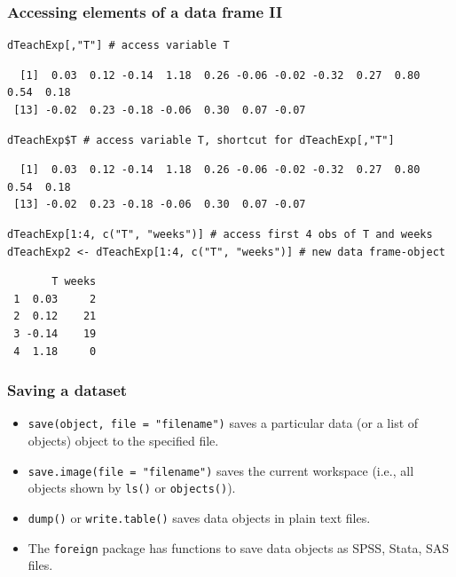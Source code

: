 \documentclass[bigger]{beamer}
\begin{document}
\begin{frame}[fragile,shrink=30]
\frametitle{Accessing elements of a data frame II}
\label{sec-3-1-7}



\lstset{language=R}
\begin{lstlisting}
dTeachExp[,"T"] # access variable T
\end{lstlisting}

\begin{verbatim}
  [1]  0.03  0.12 -0.14  1.18  0.26 -0.06 -0.02 -0.32  0.27  0.80  0.54  0.18
 [13] -0.02  0.23 -0.18 -0.06  0.30  0.07 -0.07
\end{verbatim}


\lstset{language=R}
\begin{lstlisting}
dTeachExp$T # access variable T, shortcut for dTeachExp[,"T"]
\end{lstlisting}

\begin{verbatim}
  [1]  0.03  0.12 -0.14  1.18  0.26 -0.06 -0.02 -0.32  0.27  0.80  0.54  0.18
 [13] -0.02  0.23 -0.18 -0.06  0.30  0.07 -0.07
\end{verbatim}


\lstset{language=R}
\begin{lstlisting}
dTeachExp[1:4, c("T", "weeks")] # access first 4 obs of T and weeks
dTeachExp2 <- dTeachExp[1:4, c("T", "weeks")] # new data frame-object
\end{lstlisting}

\begin{verbatim}
       T weeks
 1  0.03     2
 2  0.12    21
 3 -0.14    19
 4  1.18     0
\end{verbatim}
\end{frame}
\begin{frame}
\frametitle{Saving a dataset}
\label{sec-3-1-8}

\begin{itemize}
\item \texttt{save(object, file = "filename")} saves a particular data (or a list of objects) object to the
      specified file.
\item \texttt{save.image(file = "filename")} saves the current workspace (i.e., all objects shown by \texttt{ls()} or
      \texttt{objects()}).
\item \texttt{dump()} or \texttt{write.table()} saves data objects in plain text files.
\item The \texttt{foreign} package has functions to save data objects as SPSS, Stata, SAS files.
\end{itemize}
\end{frame}
\end{document}
